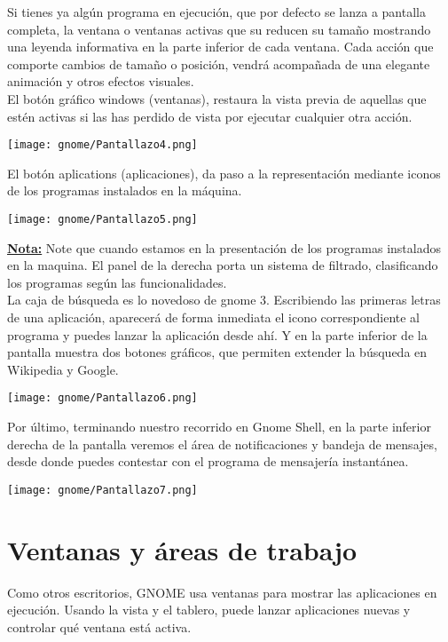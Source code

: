 \begin{itemize}
\begin{itemize}
\end{itemize}
Si tienes ya algún programa en ejecución, que por defecto se lanza a pantalla completa, la ventana o ventanas activas que su reducen su tamaño mostrando una leyenda informativa en la parte inferior de cada ventana. Cada acción que comporte cambios de tamaño o posición, vendrá acompañada de una elegante animación y otros efectos visuales.\\
El botón gráfico windows (ventanas), restaura la vista previa de aquellas que estén activas si las has perdido de vista por ejecutar cualquier otra acción.
\begin{center}
\texttt{[image: gnome/Pantallazo4.png]} 
\end{center}
El botón aplications (aplicaciones), da paso a la representación mediante iconos de los programas instalados en la máquina.
\begin{center}
\texttt{[image: gnome/Pantallazo5.png]}
\end{center}
\underline{\bf Nota:} Note que cuando estamos en la presentación de los programas instalados en la maquina. El panel de la derecha porta un sistema de filtrado, clasificando los programas según las funcionalidades.\\

La caja de búsqueda es lo novedoso de gnome 3. Escribiendo las primeras letras de una aplicación, aparecerá de forma inmediata el icono correspondiente al programa y puedes lanzar la aplicación desde ahí. Y en la parte inferior de la pantalla muestra dos botones gráficos, que permiten extender la búsqueda en Wikipedia y Google. 
\begin{center}
\texttt{[image: gnome/Pantallazo6.png]}
\end{center}
Por último, terminando nuestro recorrido en Gnome Shell, en la parte inferior derecha de la pantalla veremos el área de notificaciones y bandeja de mensajes, desde donde puedes contestar con el programa de mensajería instantánea.
\begin{center}
\texttt{[image: gnome/Pantallazo7.png]} 
\end{center}
\end{itemize}
\section{Ventanas y áreas de trabajo}
Como otros escritorios, GNOME usa ventanas para mostrar las aplicaciones en ejecución. Usando la vista y el tablero, puede lanzar aplicaciones nuevas y controlar qué ventana está activa.\\

